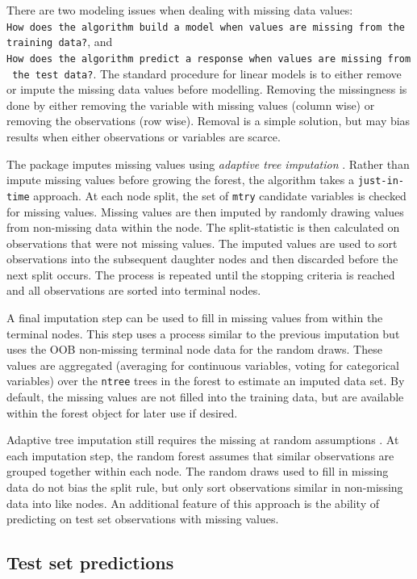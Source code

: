 \documentclass[article, nojss]{jss}
\begin{document}
There are two modeling issues when dealing with missing data values:
\texttt{How\ does\ the\ algorithm\ build\ a\ model\ when\ values\ are\ missing\ from\ the\ training\ data?},
and
\texttt{How\ does\ the\ algorithm\ predict\ a\ response\ when\ values\ are\ missing\ from\ the\ test\ data?}.
The standard procedure for linear models is to either remove or impute
the missing data values before modelling. Removing the missingness is
done by either removing the variable with missing values (column wise)
or removing the observations (row wise). Removal is a simple solution,
but may bias results when either observations or variables are scarce.

The  package imputes missing values using
\emph{adaptive tree imputation} \citep{Ishwaran:2008}. Rather than
impute missing values before growing the forest, the algorithm takes a
\texttt{just-in-time} approach. At each node split, the set of
\texttt{mtry} candidate variables is checked for missing values. Missing
values are then imputed by randomly drawing values from non-missing data
within the node. The split-statistic is then calculated on observations
that were not missing values. The imputed values are used to sort
observations into the subsequent daughter nodes and then discarded
before the next split occurs. The process is repeated until the stopping
criteria is reached and all observations are sorted into terminal nodes.

A final imputation step can be used to fill in missing values from
within the terminal nodes. This step uses a process similar to the
previous imputation but uses the OOB non-missing terminal node data for
the random draws. These values are aggregated (averaging for continuous
variables, voting for categorical variables) over the \texttt{ntree}
trees in the forest to estimate an imputed data set. By default, the
missing values are not filled into the training data, but are available
within the forest object for later use if desired.

Adaptive tree imputation still requires the missing at random
assumptions \citep{Rubin:1976}. At each imputation step, the random
forest assumes that similar observations are grouped together within
each node. The random draws used to fill in missing data do not bias the
split rule, but only sort observations similar in non-missing data into
like nodes. An additional feature of this approach is the ability of
predicting on test set observations with missing values.

\subsection{Test set predictions}\label{test-set-predictions}
\end{document}
